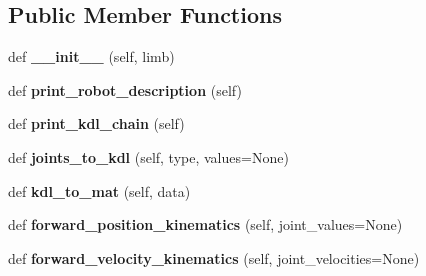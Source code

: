 \subsection*{Public Member Functions}
\begin{DoxyCompactItemize}
\item 
\hypertarget{classaml__robot_1_1baxter__kinematics_1_1baxter__kinematics_aed9dbf5f80678e461bf194b0519dde67}{}\label{classaml__robot_1_1baxter__kinematics_1_1baxter__kinematics_aed9dbf5f80678e461bf194b0519dde67} 
def {\bfseries \+\_\+\+\_\+init\+\_\+\+\_\+} (self, limb)
\item 
\hypertarget{classaml__robot_1_1baxter__kinematics_1_1baxter__kinematics_a2c85320187d394fbcc006978ce76cf1e}{}\label{classaml__robot_1_1baxter__kinematics_1_1baxter__kinematics_a2c85320187d394fbcc006978ce76cf1e} 
def {\bfseries print\+\_\+robot\+\_\+description} (self)
\item 
\hypertarget{classaml__robot_1_1baxter__kinematics_1_1baxter__kinematics_a07f30dcb629593221d2e72be1fe6f706}{}\label{classaml__robot_1_1baxter__kinematics_1_1baxter__kinematics_a07f30dcb629593221d2e72be1fe6f706} 
def {\bfseries print\+\_\+kdl\+\_\+chain} (self)
\item 
\hypertarget{classaml__robot_1_1baxter__kinematics_1_1baxter__kinematics_acd22e7c485fa9e6491660ce742d6a79d}{}\label{classaml__robot_1_1baxter__kinematics_1_1baxter__kinematics_acd22e7c485fa9e6491660ce742d6a79d} 
def {\bfseries joints\+\_\+to\+\_\+kdl} (self, type, values=None)
\item 
\hypertarget{classaml__robot_1_1baxter__kinematics_1_1baxter__kinematics_a127ea18b1afcc0cc4101a5cbeb7bb338}{}\label{classaml__robot_1_1baxter__kinematics_1_1baxter__kinematics_a127ea18b1afcc0cc4101a5cbeb7bb338} 
def {\bfseries kdl\+\_\+to\+\_\+mat} (self, data)
\item 
\hypertarget{classaml__robot_1_1baxter__kinematics_1_1baxter__kinematics_a36627392fbb1042d620be2f1371d56b6}{}\label{classaml__robot_1_1baxter__kinematics_1_1baxter__kinematics_a36627392fbb1042d620be2f1371d56b6} 
def {\bfseries forward\+\_\+position\+\_\+kinematics} (self, joint\+\_\+values=None)
\item 
\hypertarget{classaml__robot_1_1baxter__kinematics_1_1baxter__kinematics_ab4e21cd41702f8923771f8ce2d107fd4}{}\label{classaml__robot_1_1baxter__kinematics_1_1baxter__kinematics_ab4e21cd41702f8923771f8ce2d107fd4} 
def {\bfseries forward\+\_\+velocity\+\_\+kinematics} (self, joint\+\_\+velocities=None)
\item 
\hypertarget{classaml__robot_1_1baxter__kinematics_1_1baxter__kinematics_afeb7506b1b0cb2ce1489c154e07dfe0a}{}\label{classaml__robot_1_1baxter__kinematics_1_1baxter__kinematics_afeb7506b1b0cb2ce1489c154e07dfe0a} 

\end{DoxyCompactItemize}
